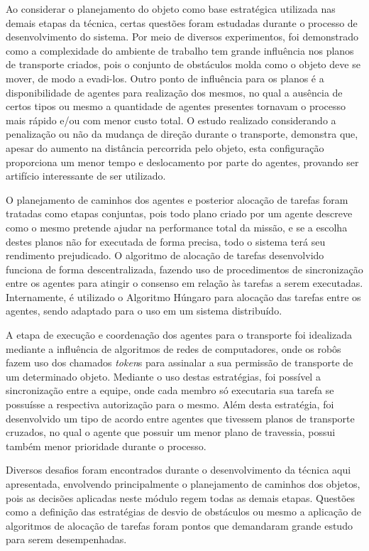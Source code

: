 Ao considerar o planejamento do objeto como base estratégica utilizada nas demais etapas da técnica, certas questões foram estudadas durante o processo de desenvolvimento do sistema.
%
Por meio de diversos experimentos, foi demonstrado como a complexidade do ambiente de trabalho tem grande influência nos planos de transporte criados, pois o conjunto de obstáculos molda como o objeto deve se mover, de modo a evadi-los.
%
Outro ponto de influência para os planos é a disponibilidade de agentes para realização dos mesmos, no qual a ausência de certos tipos ou mesmo a quantidade de agentes presentes tornavam o processo mais rápido e/ou com menor custo total.
%
O estudo realizado considerando a penalização ou não da mudança de direção durante o transporte, demonstra que, apesar do aumento na distância percorrida pelo objeto, esta configuração proporciona um menor tempo e deslocamento por parte do agentes, provando ser artifício interessante de ser utilizado.

O planejamento de caminhos dos agentes e posterior alocação de tarefas foram tratadas como etapas conjuntas, pois todo plano criado por um agente descreve como o mesmo pretende ajudar na performance total da missão, e se a escolha destes planos não for executada de forma precisa, todo o sistema terá seu rendimento prejudicado.
%
O algoritmo de alocação de tarefas desenvolvido funciona de forma descentralizada, fazendo uso de procedimentos de sincronização entre os agentes para atingir o consenso em relação às tarefas a serem executadas.
Internamente, é utilizado o Algoritmo Húngaro para alocação das tarefas entre os agentes, sendo adaptado para o uso em um sistema distribuído.

A etapa de execução e coordenação dos agentes para o transporte foi idealizada mediante a influência de algoritmos de redes de computadores, onde os robôs fazem uso dos chamados \emph{token}s para assinalar a sua permissão de transporte de um determinado objeto.
Mediante o uso destas estratégias, foi possível a sincronização entre a equipe, onde cada membro só executaria sua tarefa se possuísse a respectiva autorização para o mesmo.
%
Além desta estratégia, foi desenvolvido um tipo de acordo entre agentes que tivessem planos de transporte cruzados, no qual o agente que possuir um menor plano de travessia, possui também menor prioridade durante o processo.


Diversos desafios foram encontrados durante o desenvolvimento da técnica aqui apresentada, envolvendo principalmente o planejamento de caminhos dos objetos, pois as decisões aplicadas neste módulo regem todas as demais etapas.
Questões como a definição das estratégias de desvio de obstáculos ou mesmo a aplicação de algoritmos de alocação de tarefas foram pontos que demandaram grande estudo para serem desempenhadas.


